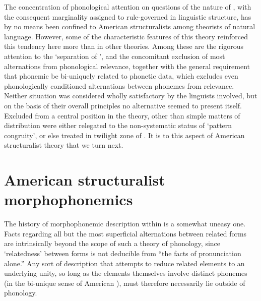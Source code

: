 The concentration of phonological attention on questions of the nature
of , with the consequent marginality assigned to
rule-governed  in linguistic structure, has by no means
been confined to American structuralists among theorists of natural
language. However, some of the characteristic features of this theory
reinforced this tendency here more than in other theories. Among these
are the rigorous attention to the `separation of ', and the
concomitant exclusion of most alternations from phonological
relevance, together with the general requirement that phonemic
 be bi-uniquely related to phonetic data, which excludes
even phonologically conditioned alternations between phonemes from
relevance. Neither situation was considered wholly satisfactory by the
linguists involved, but on the basis of their overall principles no
alternative seemed to present itself. Excluded from a central position
in the theory,  other than simple matters of distribution
were either relegated to the non-systematic status of `pattern
congruity', or else treated in twilight zone of . It is
to this aspect of American structuralist theory that we turn next.

\section{American structuralist morphophonemics}
\label{sec:struct-morphophonemics}

The history of morphophonemic description within  is a somewhat uneasy one. Facts regarding all but the
most superficial alternations between related forms are intrinsically
beyond the scope of such a theory of phonology, since `relatedness'
between forms is not deducible from ``the facts of pronunciation
alone.'' Any sort of description that attempts to reduce related
elements to an underlying unity, so long as the elements themselves
involve distinct phonemes (in the bi-unique sense of American
), must therefore necessarily lie outside of phonology.

